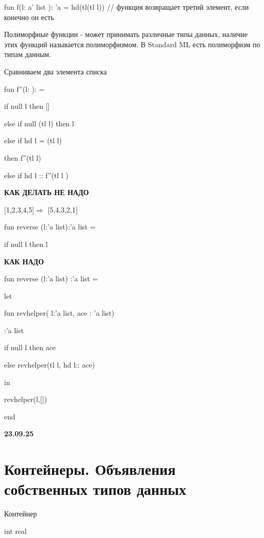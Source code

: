 \documentclass{article}
\begin{document}
fun f(l: a' list ): 'a = hd(tl(tl l)) // функция возвращает 
третий элемент, если конечно он есть


Полиморфные функции - может принимать различные типы данных, наличие этих функций
называется полиморфизмом.
В Standard ML есть полиморфизм по типам данным.


\vspace{5mm}

Сравниваем два элемента списка

fun f''(l:\hspace{10mm} ):  \hspace{10mm}    =

if null l then []

else if null (tl l) then l

else if hd l = (tl l)

then f''(tl l)

else if hd l :: f''(tl l )

\vspace{15mm}

\textbf{КАК ДЕЛАТЬ НЕ НАДО}

[1,2,3,4,5]$\Rightarrow$ [5,4,3,2,1]

fun reverse (l:'a list):'a list = 

if null l then l
\vspace{20mm}

\textbf{КАК НАДО}

fun reverse (l:'a list) :'a list = 

let

fun revhelper( l:'a list, ace : 'a list)

\hspace{50mm} :'a list

if null l then ace

else revhelper(tl l, hd l:: ace)

in 

revhelper(l,[])

end

\vspace{10mm}

\textbf{23.09.25}

\section{Контейнеры. Объявления собственных типов данных}

Контейнер 

int \hspace{20mm}real
\end{document}
